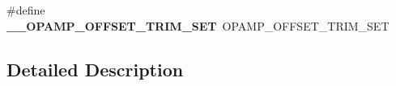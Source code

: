 \begin{DoxyCompactItemize}
\item 
\#define {\bfseries \+\_\+\+\_\+\+O\+P\+A\+M\+P\+\_\+\+O\+F\+F\+S\+E\+T\+\_\+\+T\+R\+I\+M\+\_\+\+S\+ET}~O\+P\+A\+M\+P\+\_\+\+O\+F\+F\+S\+E\+T\+\_\+\+T\+R\+I\+M\+\_\+\+S\+ET\hypertarget{group___h_a_l___o_p_a_m_p___aliased___macros_ga1b8216e44e3f38a0c394d4451fae1255}{}\label{group___h_a_l___o_p_a_m_p___aliased___macros_ga1b8216e44e3f38a0c394d4451fae1255}

\end{DoxyCompactItemize}


\subsection{Detailed Description}
